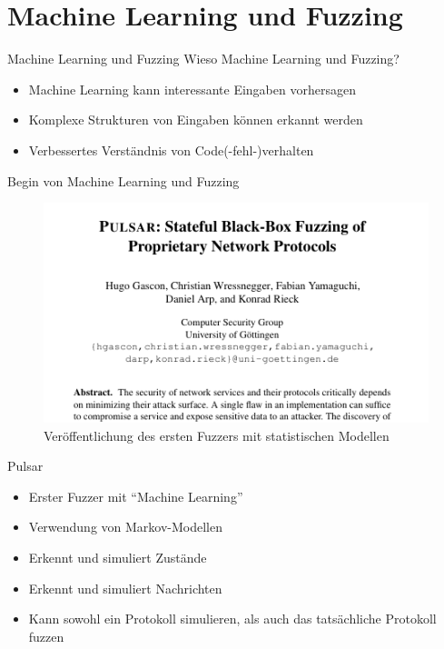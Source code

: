
\section{Machine Learning und Fuzzing}\label{sec:machine-learning-und-fuzzing}
\begin{frame}{Machine Learning und Fuzzing}
    Wieso Machine Learning und Fuzzing?
    \begin{itemize}
        \item Machine Learning kann interessante Eingaben vorhersagen
        \item Komplexe Strukturen von Eingaben können erkannt werden
        \item Verbessertes Verständnis von Code(-fehl-)verhalten
    \end{itemize}
\end{frame}
\begin{frame}{Begin von Machine Learning und Fuzzing}
    \begin{figure}[H]
        \centering
        \includegraphics[width=\textwidth]{res/pulsar}
        \caption[Pioniere des Fuzzing mit Machine Learning]{
            Veröffentlichung des ersten Fuzzers mit statistischen Modellen~\cite{thuraisingham_pulsar_2015}
        }
        \label{fig:ml_fuzzing}
    \end{figure}
\end{frame}
\begin{frame}{Pulsar}
    \begin{itemize}
        \item Erster Fuzzer mit \enquote{Machine Learning}
        \item Verwendung von Markov-Modellen
        \item Erkennt und simuliert Zustände
        \item Erkennt und simuliert Nachrichten
        \item Kann sowohl ein Protokoll simulieren, als auch das tatsächliche Protokoll fuzzen
    \end{itemize}
\end{frame}
